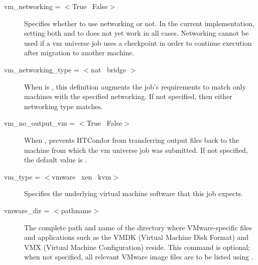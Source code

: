 \begin{description}
\label{condor-submit-vm-networking}
\item[vm\_networking = $<$True \Bar\ False$>$]
Specifies whether to use networking or not.
In the current implementation, setting both
 and 
to  does not yet work in all cases.
Networking cannot be used if a vm universe job uses a
checkpoint in order to continue execution after migration
to another machine.


\label{condor-submit-vm-networking-type}
\item[vm\_networking\_type = $<$nat \Bar\ bridge $>$]
When  is ,
this definition augments the job's requirements to match
only machines with the specified networking.
If not specified, then either networking type matches.


\label{condor-submit-vm-no-output-vm}
\item[vm\_no\_output\_vm = $<$True \Bar\ False$>$]
When , prevents HTCondor from transferring output
files back to the machine from which the vm universe job
was submitted.
If not specified, the default value is .


\label{condor-submit-vm-type}
\item[vm\_type = $<$vmware \Bar\ xen \Bar\ kvm$>$]
Specifies the underlying virtual machine software that this
job expects.


\label{condor-submit-vmware-dir}
\item[vmware\_dir = $<$pathname$>$]
The complete path and name of the directory where VMware-specific
files and applications such as the VMDK (Virtual Machine Disk Format) and
VMX (Virtual Machine Configuration) reside.
This command is optional; when not specified, all relevant VMware image files
are to be listed using .



\end{description}
